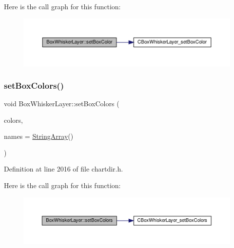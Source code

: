 Here is the call graph for this function\+:
\nopagebreak
\begin{figure}[H]
\begin{center}
\leavevmode
\includegraphics[width=350pt]{class_box_whisker_layer_a5112e86b72df00f7189b56bbe795d40e_cgraph}
\end{center}
\end{figure}
\mbox{\label{class_box_whisker_layer_ac8e09d31247ba6751447d3ea2254744c}} 
\subsubsection{\texorpdfstring{set\+Box\+Colors()}{setBoxColors()}}
{\footnotesize\ttfamily void Box\+Whisker\+Layer\+::set\+Box\+Colors (\begin{DoxyParamCaption}\item[{\hyperlink{class_int_array}{Int\+Array}}]{colors,  }\item[{\hyperlink{class_string_array}{String\+Array}}]{names = {\ttfamily \hyperlink{class_string_array}{String\+Array}()} }\end{DoxyParamCaption})\hspace{0.3cm}{\ttfamily [inline]}}



Definition at line 2016 of file chartdir.\+h.

Here is the call graph for this function\+:
\nopagebreak
\begin{figure}[H]
\begin{center}
\leavevmode
\includegraphics[width=350pt]{class_box_whisker_layer_ac8e09d31247ba6751447d3ea2254744c_cgraph}
\end{center}
\end{figure}
\mbox{\label{class_box_whisker_layer_a352ca63547e3faaa3491ba955ce64ea8}} 
